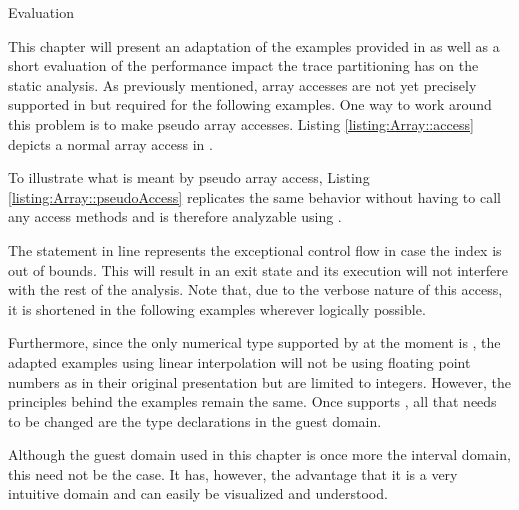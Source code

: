 %

\begin{chapter}{Evaluation}
	\label{chapter:Evaluation}

	This chapter will present an adaptation of the examples provided in \cite{mauborgne:rival05} as well as a short evaluation of the performance impact the trace partitioning has on the static analysis. As previously mentioned, array accesses are not yet precisely supported in \sample but required for the following examples. One way to work around this problem is to make pseudo array accesses. Listing \ref{listing:Array::access} depicts a normal array access in \scala.
	
	

	To illustrate what is meant by pseudo array access, Listing \ref{listing:Array::pseudoAccess} replicates the same behavior without having to call any access methods and is therefore analyzable using \sample. 

	

	The  statement in line  represents the exceptional control flow in case the index is out of bounds. This will result in an exit state and its execution will not interfere with the rest of the analysis. Note that, due to the verbose nature of this access, it is shortened in the following examples wherever logically possible.

		Furthermore, since the only numerical type supported by \sample at the moment is , the adapted examples using linear interpolation will not be using floating point numbers as in their original presentation but are limited to integers. However, the principles behind the examples remain the same. Once \sample supports , all that needs to be changed are the type declarations in the guest domain.

	Although the guest domain used in this chapter is once more the interval domain, this need not be the case. It has, however, the advantage that it is a very intuitive domain and can easily be visualized and understood.


\end{chapter}

